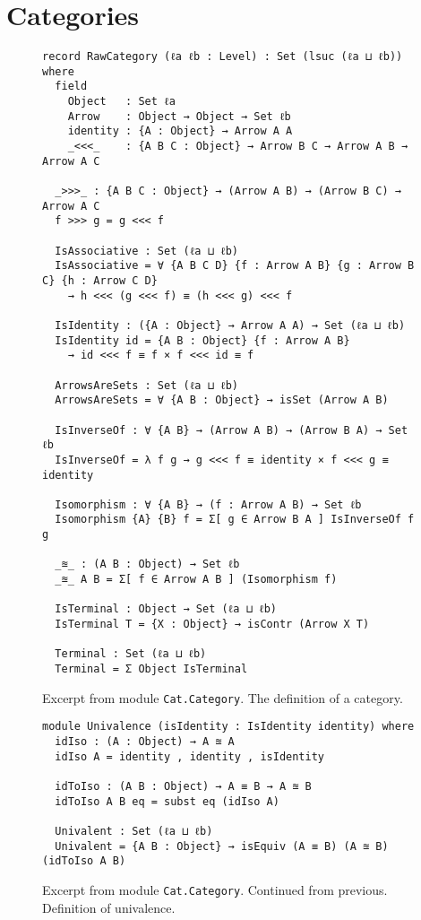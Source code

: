 \section{Categories}
\label{sec:app-categories}
\begin{figure}[h]
\begin{Verbatim}
record RawCategory (ℓa ℓb : Level) : Set (lsuc (ℓa ⊔ ℓb)) where
  field
    Object   : Set ℓa
    Arrow    : Object → Object → Set ℓb
    identity : {A : Object} → Arrow A A
    _<<<_    : {A B C : Object} → Arrow B C → Arrow A B → Arrow A C

  _>>>_ : {A B C : Object} → (Arrow A B) → (Arrow B C) → Arrow A C
  f >>> g = g <<< f

  IsAssociative : Set (ℓa ⊔ ℓb)
  IsAssociative = ∀ {A B C D} {f : Arrow A B} {g : Arrow B C} {h : Arrow C D}
    → h <<< (g <<< f) ≡ (h <<< g) <<< f

  IsIdentity : ({A : Object} → Arrow A A) → Set (ℓa ⊔ ℓb)
  IsIdentity id = {A B : Object} {f : Arrow A B}
    → id <<< f ≡ f × f <<< id ≡ f

  ArrowsAreSets : Set (ℓa ⊔ ℓb)
  ArrowsAreSets = ∀ {A B : Object} → isSet (Arrow A B)

  IsInverseOf : ∀ {A B} → (Arrow A B) → (Arrow B A) → Set ℓb
  IsInverseOf = λ f g → g <<< f ≡ identity × f <<< g ≡ identity

  Isomorphism : ∀ {A B} → (f : Arrow A B) → Set ℓb
  Isomorphism {A} {B} f = Σ[ g ∈ Arrow B A ] IsInverseOf f g

  _≊_ : (A B : Object) → Set ℓb
  _≊_ A B = Σ[ f ∈ Arrow A B ] (Isomorphism f)

  IsTerminal : Object → Set (ℓa ⊔ ℓb)
  IsTerminal T = {X : Object} → isContr (Arrow X T)

  Terminal : Set (ℓa ⊔ ℓb)
  Terminal = Σ Object IsTerminal
\end{Verbatim}
\caption{Excerpt from module \texttt{Cat.Category}. The definition of a category.}
\end{figure}
\clearpage
\begin{figure}[h]
\begin{Verbatim}
module Univalence (isIdentity : IsIdentity identity) where
  idIso : (A : Object) → A ≊ A
  idIso A = identity , identity , isIdentity

  idToIso : (A B : Object) → A ≡ B → A ≊ B
  idToIso A B eq = subst eq (idIso A)

  Univalent : Set (ℓa ⊔ ℓb)
  Univalent = {A B : Object} → isEquiv (A ≡ B) (A ≊ B) (idToIso A B)
\end{Verbatim}
\caption{Excerpt from module \texttt{Cat.Category}. Continued from previous. Definition of univalence.}
\end{figure}
